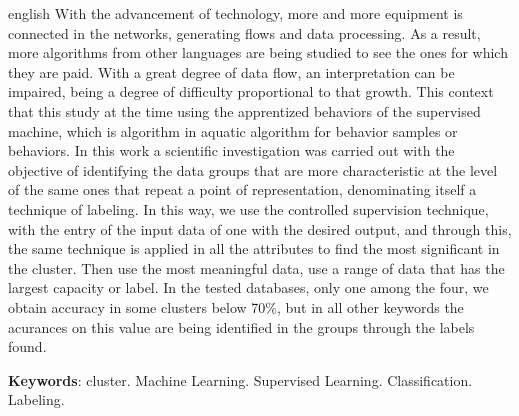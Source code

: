 \begin{resumo}[Abstract]
 \begin{otherlanguage*}{english}
 With the advancement of technology, more and more equipment is connected in the networks, generating flows and data processing. As a result, more algorithms from other languages ​​are being studied to see the ones for which they are paid. With a great degree of data flow, an interpretation can be impaired, being a degree of difficulty proportional to that growth. This context that this study at the time using the apprentized behaviors of the supervised machine, which is algorithm in aquatic algorithm for behavior samples or behaviors. In this work a scientific investigation was carried out with the objective of identifying the data groups that are more characteristic at the level of the same ones that repeat a point of representation, denominating itself a technique of labeling. In this way, we use the controlled supervision technique, with the entry of the input data of one with the desired output, and through this, the same technique is applied in all the attributes to find the most significant in the cluster. Then use the most meaningful data, use a range of data that has the largest capacity or label. In the tested databases, only one among the four, we obtain accuracy in some clusters below 70\%, but in all other keywords the acurances on this value are being identified in the groups through the labels found.
   
   
   \vspace{\onelineskip}
 
   \noindent 
   \textbf{Keywords}:  cluster. Machine Learning. Supervised Learning. Classification. Labeling.
 \end{otherlanguage*}
\end{resumo}
